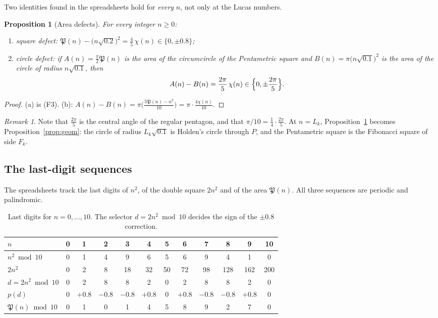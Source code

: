 \documentclass[11pt,a4paper]{article}
\newcommand{\Pent}{\mathfrak{P}}                      %
\theoremstyle{plain}
\newtheorem{proposition}[theorem]{Proposition}
\theoremstyle{definition}
\theoremstyle{remark}
\newtheorem{remark}[theorem]{Remark}
\begin{document}
Two identities found in the spreadsheets hold for \emph{every} $n$, not only at the Lucas numbers.

\begin{proposition}[Area defects]\label{prop:defects}
For every integer $n\ge0$:
\begin{enumerate}[label=(\alph*),itemsep=2pt]
  \item \emph{square defect:} $\Pent(n)-\bigl(n\sqrt{0.2}\bigr)^{2}=\tfrac45\,\chi(n)\in\{0,\pm0.8\}$;
  \item \emph{circle defect:} if $A(n)=\tfrac{\pi}{2}\Pent(n)$ is the area of the circumcircle of the Pentametric square and $B(n)=\pi\bigl(n\sqrt{0.1}\bigr)^{2}$ is the area of the circle of radius $n\sqrt{0.1}$, then
  \[
    A(n)-B(n)=\frac{2\pi}{5}\,\chi(n)\in\Bigl\{0,\pm\frac{2\pi}{5}\Bigr\}.
  \]
\end{enumerate}
\end{proposition}

\begin{proof}
(a) is (F3). (b): $A(n)-B(n)=\pi\bigl(\tfrac{5\Pent(n)-n^{2}}{10}\bigr)=\pi\cdot\tfrac{4\chi(n)}{10}$.
\end{proof}

\begin{remark}
Note that $\tfrac{2\pi}{5}$ is the central angle of the regular pentagon, and that $\pi/10=\tfrac14\cdot\tfrac{2\pi}{5}$. At $n=L_k$, Proposition~\ref{prop:defects} becomes Proposition~\ref{prop:geom}: the circle of radius $L_k\sqrt{0.1}$ is Holden's circle through $P$, and the Pentametric square is the Fibonacci square of side $F_k$.
\end{remark}


\subsection{The last-digit sequences}\label{sec:lastdigits}

The spreadsheets track the last digits of $n^{2}$, of the double square $2n^{2}$ and of the area $\Pent(n)$. All three sequences are periodic and palindromic.

\begin{table}[ht]
\centering\small
\caption{Last digits for $n=0,\dots,10$. The selector $d=2n^{2}\bmod10$ decides the sign of the $\pm0.8$ correction.}\label{tab:lastdigits}
\setlength{\tabcolsep}{4pt}
\begin{tabular}{@{}l*{11}{c}@{}}
\toprule
$n$ & 0&1&2&3&4&5&6&7&8&9&10\\
\midrule
$n^{2}\bmod10$ & 0&1&4&9&6&5&6&9&4&1&0\\
$2n^{2}$ & 0&2&8&18&32&50&72&98&128&162&200\\
$d=2n^{2}\bmod10$ & 0&2&8&8&2&0&2&8&8&2&0\\
$p(d)$ & 0&$+0.8$&$-0.8$&$-0.8$&$+0.8$&0&$+0.8$&$-0.8$&$-0.8$&$+0.8$&0\\
$\Pent(n)\bmod10$ & 0&1&0&1&4&5&8&9&2&7&0\\
\bottomrule
\end{tabular}
\end{table}
\end{document}
